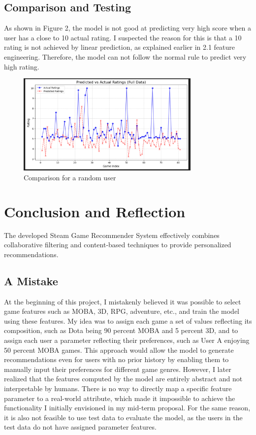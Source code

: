 \documentclass[12pt]{article}
\begin{document}
\subsection{Comparison and Testing}
As shown in Figure 2, the model is not good at predicting very high score when a user has a close to 10 actual rating. I suspected the reason for this is that a 10 rating is not achieved by linear prediction, as explained earlier in 2.1 feature engineering.  Therefore, the model can not follow the normal rule to predict very high rating.
\begin{figure}[h]
	\centering
	\includegraphics[width=0.8\textwidth]{compare.png} %
	\caption{Comparison for a random user}
	\label{fig:Comparison for a random user}
\end{figure}

\section{Conclusion and Reflection}
The developed Steam Game Recommender System effectively combines collaborative filtering and content-based techniques to provide personalized recommendations. 
\subsection{A Mistake}
At the beginning of this project, I mistakenly believed it was possible to select game features such as MOBA, 3D, RPG, adventure, etc., and train the model using these features. My idea was to assign each game a set of values reflecting its composition, such as Dota being 90 percent MOBA and 5 percent  3D, and to assign each user a parameter reflecting their preferences, such as User A enjoying 50 percent  MOBA games. This approach would allow the model to generate recommendations even for users with no prior history by enabling them to manually input their preferences for different game genres. However, I later realized that the features computed by the model are entirely abstract and not interpretable by humans. There is no way to directly map a specific feature parameter to a real-world attribute, which made it impossible to achieve the functionality I initially envisioned in my mid-term proposal. For the same reason, it is also not feasible to use test data to evaluate the model, as the users in the test data do not have assigned parameter features.
\end{document}
